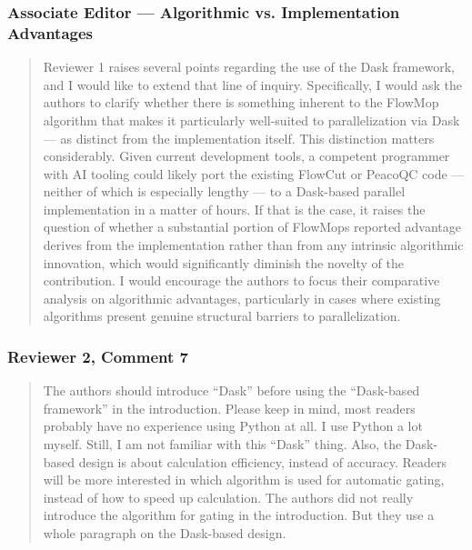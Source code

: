 \documentclass[
  11pt,
  a4paper,
]{article}
\begin{document}
\subsubsection{Associate Editor --- Algorithmic vs. Implementation
Advantages}\label{associate-editor--algorithmic-vs-implementation-advantages}

\begin{quote}
Reviewer 1 raises several points regarding the use of the Dask
framework, and I would like to extend that line of inquiry.
Specifically, I would ask the authors to clarify whether there is
something inherent to the FlowMop algorithm that makes it particularly
well-suited to parallelization via Dask --- as distinct from the
implementation itself. This distinction matters considerably. Given
current development tools, a competent programmer with AI tooling could
likely port the existing FlowCut or PeacoQC code --- neither of which is
especially lengthy --- to a Dask-based parallel implementation in a
matter of hours. If that is the case, it raises the question of whether
a substantial portion of FlowMop\textquotesingle s reported advantage
derives from the implementation rather than from any intrinsic
algorithmic innovation, which would significantly diminish the novelty
of the contribution. I would encourage the authors to focus their
comparative analysis on algorithmic advantages, particularly in cases
where existing algorithms present genuine structural barriers to
parallelization.
\end{quote}

\subsubsection{Reviewer 2, Comment 7}\label{reviewer-2-comment-7}

\begin{quote}
The authors should introduce ``Dask'' before using the ``Dask-based
framework'' in the introduction. Please keep in mind, most readers
probably have no experience using Python at all. I use Python a lot
myself. Still, I am not familiar with this ``Dask'' thing. Also, the
Dask-based design is about calculation efficiency, instead of accuracy.
Readers will be more interested in which algorithm is used for automatic
gating, instead of how to speed up calculation. The authors did not
really introduce the algorithm for gating in the introduction. But they
use a whole paragraph on the Dask-based design.
\end{quote}
\end{document}
